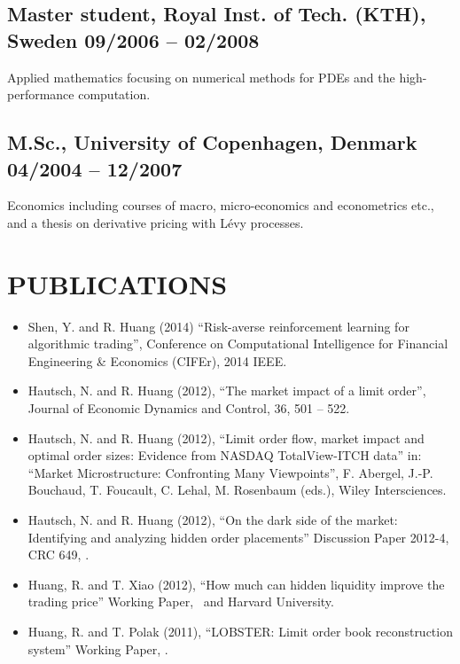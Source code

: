 \documentclass[a4paper,10pt]{article}
\begin{document}
\subsection{Master student, Royal Inst. of Tech. (KTH), Sweden \hfill 09/2006 -- 02/2008}
\begin{idesc}
\item[Applied mathematics] focusing on numerical methods for PDEs and the high-performance computation.
\end{idesc}
\subsection{M.Sc., University of Copenhagen, Denmark \hfill 04/2004 -- 12/2007}
\begin{idesc}
\item[Economics] including courses of macro, micro-economics and econometrics etc., and a thesis on derivative pricing with L\'{e}vy processes.  
\end{idesc}

\section{PUBLICATIONS}
\begin{itemize}
\item Shen, Y. and R. Huang (2014) ``Risk-averse reinforcement learning for algorithmic trading'', Conference on Computational Intelligence for Financial Engineering \& Economics (CIFEr), 2014 IEEE.
\item Hautsch, N. and R. Huang (2012), ``The market impact of a limit order'', Journal of Economic Dynamics and Control, 36, 501 – 522.
\item  Hautsch, N. and R. Huang (2012), ``Limit order flow, market impact and optimal order sizes: Evidence from NASDAQ TotalView-ITCH data'' in: ``Market Microstructure: Confronting Many Viewpoints'', F. Abergel, J.-P. Bouchaud, T. Foucault, C. Lehal, M. Rosenbaum (eds.), Wiley Intersciences.
\item Hautsch, N. and R. Huang (2012), ``On the dark side of the market: Identifying and analyzing hidden order placements'' Discussion Paper 2012-4, CRC 649, \HU.
\item  Huang, R. and T. Xiao (2012), ``How much can hidden liquidity improve the trading price'' Working Paper, \HU\ and Harvard University.
\item Huang, R. and T. Polak (2011), ``LOBSTER: Limit order book reconstruction system'' Working Paper, \HU.
\end{itemize}
\end{document}
